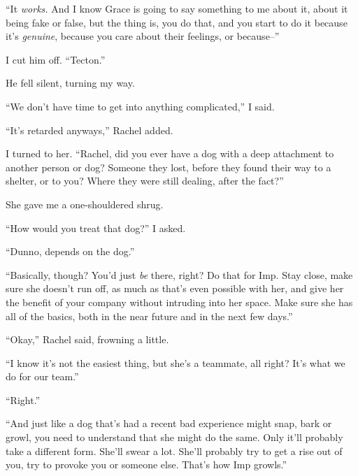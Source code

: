 ``It \emph{works.}  And I know Grace is going to say something to me about it, about it being fake or false, but the thing is, you do that, and you start to do it because it's \emph{genuine}, because you care about their feelings, or because--''



I cut him off.  ``Tecton.''



He fell silent, turning my way.



``We don't have time to get into anything complicated,'' I said.



``It's retarded anyways,'' Rachel added.



I turned to her.  ``Rachel, did you ever have a dog with a deep attachment to another person or dog?  Someone they lost, before they found their way to a shelter, or to you?  Where they were still dealing, after the fact?''



She gave me a one-shouldered shrug.



``How would you treat that dog?''  I asked.



``Dunno, depends on the dog.''



``Basically, though?  You'd just \emph{be} there, right?  Do that for Imp.  Stay close, make sure she doesn't run off, as much as that's even possible with her, and give her the benefit of your company without intruding into her space.  Make sure she has all of the basics, both in the near future and in the next few days.''



``Okay,'' Rachel said, frowning a little.



``I know it's not the easiest thing, but she's a teammate, all right?  It's what we do for our team.''



``Right.''



``And just like a dog that's had a recent bad experience might snap, bark or growl, you need to understand that she might do the same.  Only it'll probably take a different form.  She'll swear a lot.  She'll probably try to get a rise out of you, try to provoke you or someone else.  That's how Imp growls.''



